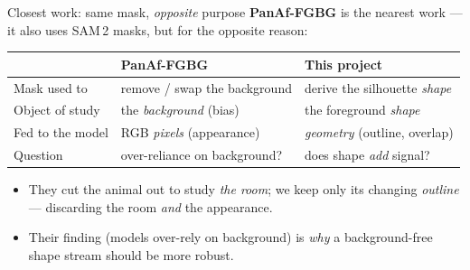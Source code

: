 \documentclass[aspectratio=169,11pt]{beamer}
\begin{document}
\begin{frame}{Closest work: same mask, \emph{opposite} purpose}
  \textbf{PanAf-FGBG} is the nearest work --- it also uses SAM\,2 masks, but for the
  opposite reason:
  \vfill
  \begin{center}\footnotesize
  \begin{tabular}{@{}lll@{}}
    \toprule
     & \textbf{PanAf-FGBG} & \textbf{This project} \\
    \midrule
    Mask used to     & remove / swap the background  & derive the silhouette \emph{shape} \\
    Object of study  & the \emph{background} (bias)   & the foreground \emph{shape} \\
    Fed to the model & RGB \emph{pixels} (appearance) & \emph{geometry} (outline, overlap) \\
    Question         & over-reliance on background?  & does shape \emph{add} signal? \\
    \bottomrule
  \end{tabular}
  \end{center}
  \vfill
  \begin{itemize}
    \item They cut the animal out to study \emph{the room}; we keep only its changing
          \emph{outline} --- discarding the room \emph{and} the appearance.
    \item Their finding (models over-rely on background) is \emph{why} a background-free
          shape stream should be more robust.
  \end{itemize}
\end{frame}
\end{document}
